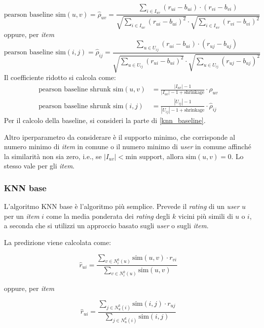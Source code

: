 \begin{itemize}
        \[
        \text{pearson baseline sim}(u, v) = \hat{\rho}_{uv} = \frac{\sum\limits_{i \in I_{uv}} (r_{ui} - b_{ui}) \cdot (r_{vi} - b_{vi})}{\sqrt{\sum\limits_{i \in I_{uv}} (r_{ui} - b_{ui})^2} \cdot \sqrt{\sum\limits_{i \in I_{uv}} (r_{vi} - b_{vi})^2}}
        \]
        oppure, per \textit{item}
        \[
        \text{pearson baseline sim}(i, j) = \hat{\rho}_{ij} = \frac{\sum\limits_{u \in U_{ij}} (r_{ui} - b_{ui}) \cdot (r_{uj} - b_{uj})}{\sqrt{\sum\limits_{u \in U_{ij}} (r_{ui} - b_{ui})^2} \cdot \sqrt{\sum\limits_{u \in U_{ij}} (r_{uj} - b_{uj})^2}}
        \]
        Il coefficiente ridotto si calcola come:
        \begin{align*}
            \text{pearson baseline shrunk sim}(u, v) &= \frac{|I_{uv}| - 1}{|I_{uv}| - 1 + \text{shrinkage}} \cdot \hat{\rho}_{uv} \\
            \text{pearson baseline shrunk sim}(i, j) &= \frac{|U_{ij}| - 1}{|U_{ij}| - 1 + \text{shrinkage}} \cdot \hat{\rho}_{ij}
        \end{align*}
        Per il calcolo della baseline, si consideri la parte di \ref{knn_baseline}.
\end{itemize}

Altro iperparametro da considerare è il supporto minimo, che corrisponde al numero minimo di \textit{item} in comune o il numero minimo di \textit{user} in comune affinché la similarità non sia zero, i.e., se $|I_{uv}| < \text{min support}$, allora $\text{sim}(u, v) = 0$. Lo stesso vale per gli \textit{item}.

\subsubsection{KNN base}

L'algoritmo KNN base è l'algoritmo più semplice. Prevede il  \textit{rating} di un \textit{user} $u$ per un \textit{item} $i$ come la media ponderata dei \textit{rating} degli $k$ vicini più simili di $u$ o $i$, a seconda che si utilizzi un approccio basato sugli \textit{user} o sugli \textit{item}.

La predizione viene calcolata come:

\[
\hat{r}_{ui} = \frac{\sum\limits_{v \in N^k_i(u)} \text{sim}(u, v) \cdot r_{vi}}{\sum\limits_{v \in N^k_i(u)} \text{sim}(u, v)}
\]

oppure, per \textit{item}

\[
\hat{r}_{ui} = \frac{\sum\limits_{j \in N^k_u(i)} \text{sim}(i, j) \cdot r_{uj}}{\sum\limits_{j \in N^k_u(i)} \text{sim}(i, j)}
\]

